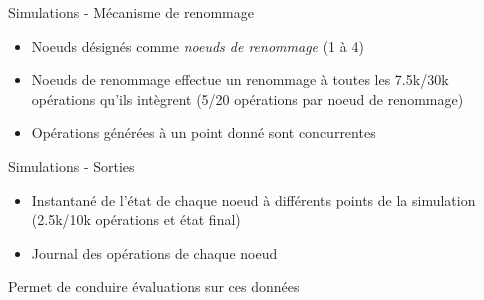 \begin{frame}{Simulations - Mécanisme de renommage}
  \begin{itemize}
    \item Noeuds désignés comme \emph{noeuds de renommage} (1 à 4)
    \item Noeuds de renommage effectue un renommage à toutes les 7.5k/30k opérations qu'ils intègrent (5/20 opérations \ren par noeud de renommage)
    \item Opérations \ren générées à un point donné sont \alert{concurrentes}
  \end{itemize}
\end{frame}

\begin{frame}{Simulations - Sorties}
  \begin{itemize}
    \item Instantané de l'état de chaque noeud à différents points de la simulation (2.5k/10k opérations et état final)
    \item Journal des opérations de chaque noeud
  \end{itemize}
  \pause
  \begin{center}
    \alert{Permet de conduire évaluations sur ces données}
  \end{center}
\end{frame}
